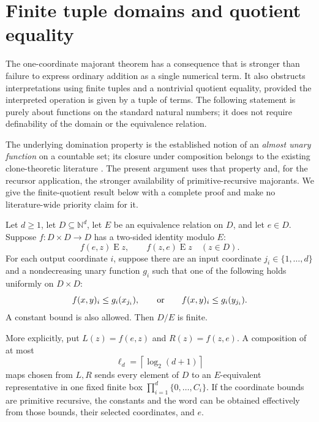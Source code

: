 \section{Finite tuple domains and quotient equality}
\label{sec:finite-quotient-obstruction}

The one-coordinate majorant theorem has a consequence that is stronger
than failure to express ordinary addition as a single numerical term.
It also obstructs interpretations using finite tuples and a nontrivial
quotient equality, provided the interpreted operation is given by a
tuple of terms. The following statement is purely about functions on
the standard natural numbers; it does not require definability of the
domain or the equivalence relation.

The underlying domination property is the established notion of an
\emph{almost unary function} on a countable set; its closure under
composition belongs to the existing clone-theoretic literature
\cite{pinsker}. The present argument uses that property and, for the
recursor application, the stronger availability of primitive-recursive
majorants. We give the finite-quotient result below with a complete
proof and make no literature-wide priority claim for it.

\begin{theorem}
\label{thm:finite-quotient}
Let $d\geq1$, let $D\subseteq\mathbb N^d$, let $E$ be an equivalence
relation on $D$, and let $e\in D$. Suppose
$f:D\times D\longrightarrow D$ has a two-sided identity modulo $E$:
\[
                  f(e,z)\mathrel E z,
                  \qquad f(z,e)\mathrel E z
                  \quad(z\in D).
\]
For each output coordinate $i$, suppose there are an input coordinate
$j_i\in\{1,\ldots,d\}$ and a nondecreasing unary function $g_i$ such
that one of the following holds uniformly on $D\times D$:
\[
 f(x,y)_i\leq g_i(x_{j_i}),
 \qquad\hbox{or}\qquad
 f(x,y)_i\leq g_i(y_{j_i}).
\]
A constant bound is also allowed. Then $D/E$ is finite.

More explicitly, put $L(z)=f(e,z)$ and $R(z)=f(z,e)$. A composition
of at most
\[
                   \ell_d=\left\lceil\log_2(d+1)\right\rceil
\]
maps chosen from $L,R$ sends every element of $D$ to an $E$-equivalent
representative in one fixed finite box
$\prod_{i=1}^d\{0,\ldots,C_i\}$. If the coordinate bounds are
primitive recursive, the constants and the word can be obtained
effectively from those bounds, their selected coordinates, and $e$.
\end{theorem}

